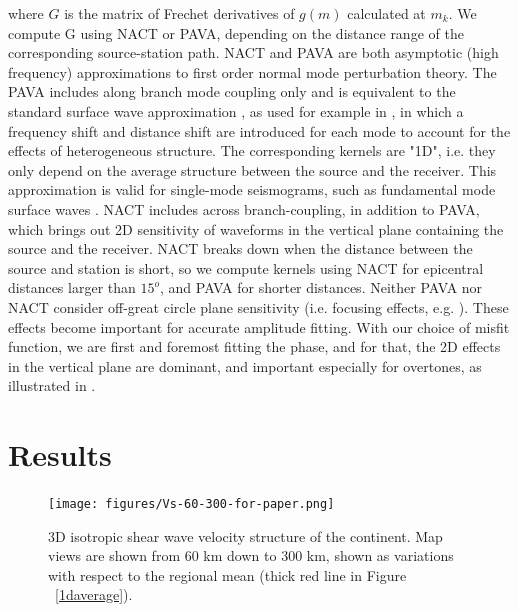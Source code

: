 \documentclass[12pt]{article}
\begin{document}
\noindent where $G$ is the matrix of Frechet derivatives of $g(m)$ calculated at $m_k$. We compute G using NACT or PAVA, depending on the distance range of the corresponding source-station path.
NACT and PAVA are both asymptotic (high frequency) approximations to first order normal mode perturbation theory. 
The PAVA includes along branch mode coupling only and is equivalent to the standard surface wave approximation \citep[e.g][]{mochizuki1986free,romanowicz1987multiplet}, as used for example in \cite{woodhouse1984mapping}, in which a frequency shift and distance shift are introduced for each mode to account for the effects of heterogeneous structure. 
The corresponding kernels are "1D", i.e. they only depend on the average structure between the source and the receiver. This approximation is valid for single-mode seismograms, such as fundamental mode surface waves \citep[e.g][]{romanowicz2008computation}.
NACT includes across branch-coupling, in addition to PAVA, which brings out 2D sensitivity of waveforms in the vertical plane containing the source and the receiver. NACT breaks down when the distance between the source and station is short, so we compute kernels using NACT for epicentral distances larger than $15^o$, and PAVA for shorter distances.
Neither PAVA nor NACT consider off-great circle plane sensitivity (i.e. focusing effects, e.g. \cite{zhou2005finite}). These effects become important for accurate amplitude fitting. With our choice of misfit function, we are first and foremost fitting the phase, and for that, the 2D effects in the vertical plane are dominant, and important especially for overtones, as illustrated in \cite{megnin1999effects,romanowicz2008computation}.


\section{Results}

\begin{figure}[ht]
	\centering
	\texttt{[image: figures/Vs-60-300-for-paper.png]}

	\caption{\baselineskip 18pt
	3D isotropic shear wave velocity structure of the continent. Map views are shown from 60 km down to 300 km, shown as variations with respect to the regional mean (thick red line in Figure ~\ref{1daverage}). 
	}

	\label{3d-VS}

\end{figure}
\end{document}
